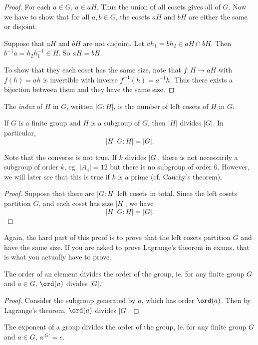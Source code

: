 \documentclass[a4paper]{article}
\begin{document}
\begin{proof}
  For each $a\in G$, $a\in aH$. Thus the union of all cosets gives all of $G$. Now we have to show that for all $a, b\in G$, the cosets $aH$ and $bH$ are either the same or disjoint.

  Suppose that $aH$ and $bH$ are not disjoint. Let $ah_1 = bh_2 \in aH \cap bH$. Then $b^{-1}a = h_2 h_1^{-1}\in H$. So $aH = bH$.

   To show that they each coset has the same size, note that $f: H \to aH$ with $f(h) = ah$ is invertible with inverse $f^{-1}(h) = a^{-1}h$. Thus there exists a bijection between them and they have the same size.
\end{proof}

\begin{defi}
  The \emph{index} of $H$ in $G$, written $|G:H|$, is the number of left cosets of $H$ in $G$.
\end{defi}

\begin{thm}
  If $G$ is a finite group and $H$ is a subgroup of $G$, then $|H|$ divides $|G|$. In particular,
  \[
    |H||G:H| = |G|.
  \]
\end{thm}
Note that the converse is not true. If $k$ divides $|G|$, there is not necessarily a subgroup of order $k$, eg. $|A_4| = 12$ but there is no subgroup of order $6$. However, we will later see that this is true if $k$ is a prime (cf. Cauchy's theorem).

\begin{proof}
  Suppose that there are $|G: H|$ left cosets in total. Since the left cosets partition $G$, and each coset has size $|H|$, we have
  \[
    |H||G:H| = |G|.
  \]
\end{proof}
Again, the hard part of this proof is to prove that the left cosets partition $G$ and have the same size. If you are asked to prove Lagrange's theorem in exams, that is what you actually have to prove.

\begin{cor}
  The order of an element divides the order of the group, ie. for any finite group $G$ and $a\in G$, $\ord(a)$ divides $|G|$.
\end{cor}
\begin{proof}
  Consider the subgroup generated by $a$, which has order $\ord(a)$. Then by Lagrange's theorem, $\ord(a)$ divides $|G|$.
\end{proof}

\begin{cor}
  The exponent of a group divides the order of the group, ie. for any finite group $G$ and $a\in G$, $a^{|G|} = e$.
\end{cor}
\end{document}
